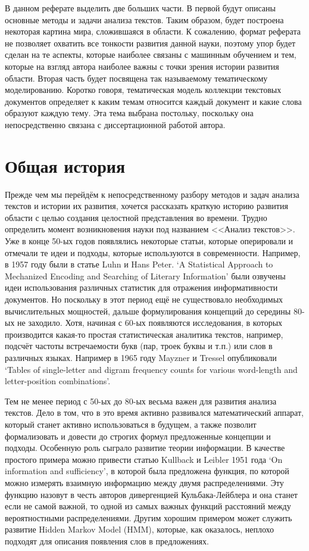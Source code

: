 \documentclass[a4paper,14pt]{extarticle}
\begin{document}
В данном реферате выделить две больших части. В первой будут описаны основные методы и задачи анализа текстов. Таким образом, будет построена некоторая картина мира, сложившаяся в области. К сожалению, формат реферата не позволяет охватить все тонкости развития данной науки, поэтому упор будет сделан на те аспекты, которые наиболее связаны с машинным обучением и тем, которые на взгляд автора наиболее важны с точки зрения истории развития области. Вторая часть будет посвящена так называемому тематическому моделированию. Коротко говоря, тематическая модель коллекции текстовых документов определяет к каким темам относится каждый документ и какие слова образуют каждую тему. Эта тема выбрана постольку, поскольку она непосредственно связана с диссертационной работой автора. 


\section{Общая история}
Прежде чем мы перейдём к непосредственному разбору методов и задач анализа текстов и истории их развития, хочется рассказать краткую историю развития области с целью создания целостной представления во времени.
Трудно определить момент возникновения науки под названием <<Анализ текстов>>. Уже в конце 50-ых годов появлялись некоторые статьи, которые оперировали и отмечали те идеи и подходы, которые используются в современности. Например, в 1957 году были в статье Luhn и Hans Peter. `A Statistical Approach to Mechanized Encoding and Searching of Literary Information' были озвучены идеи использования различных статистик для отражения информативности документов. Но поскольку в этот период ещё не существовало необходимых вычислительных мощностей, дальше формулирования концепций до середины 80-ых не заходило. Хотя, начиная с 60-ых появляются исследования, в которых производится какая-то простая статистическая аналитика текстов, например, подсчёт частоты встречаемости букв (пар, троек буквы и т.п.) или слов в различных языках. Например в 1965 году Mayzner и Tressel опубликовали `Tables of single-letter and digram frequency counts for various word-length and letter-position combinations'.

Тем не менее период с 50-ых до 80-ых весьма важен для развития анализа текстов. Дело в том, что в это время активно развивался математический аппарат, который станет активно использоваться в будущем, а также позволит формализовать и довести до строгих формул предложенные концепции и подходы. Особенную роль сыграло развитие теории информации. В качестве простого примера можно привести статью Kullback и Leibler 1951 года `On information and sufficiency', в которой была предложена функция, по которой можно измерять взаимную информацию между двумя распределениями. Эту функцию назовут в честь авторов дивергенцией Кульбака-Лейблера и она станет если не самой важной, то одной из самых важных функций расстояний между вероятностными распределениями. Другим хорошим примером может служить развитие Hidden Markov Model (HMM), которые, как оказалось, неплохо подходят для описания появления слов в предложениях.
\end{document}
